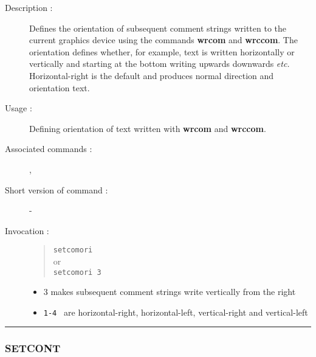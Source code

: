 \begin{description}

\item[Description :] Defines the orientation of subsequent comment
strings written to the current graphics device using the commands {\bf
wrcom} and {\bf wrccom}.  The orientation defines whether, for example,
text is written horizontally or vertically and starting at the bottom
writing upwards downwards \emph{etc.} Horizontal-right is the default
and produces normal direction and orientation text.

\item[Usage :] Defining orientation of text written with {\bf wrcom} and 
{\bf wrccom}.

\item[Associated commands :] {\tt {}}, 
{\tt {}}

\item[Short version of command :] -
\item[Invocation :]

\begin{quote}{\tt  setcomori }\\
or \\
{\tt setcomori 3 }
\end{quote}

\begin{itemize}

\item 3 makes subsequent comment strings write vertically from
 the right
\item {\tt 1-4 } are horizontal-right, horizontal-left, vertical-right
 and vertical-left
\end{itemize}

\end{description}

\hrule 
\subsubsection*{\label{SETCONT}SETCONT}

